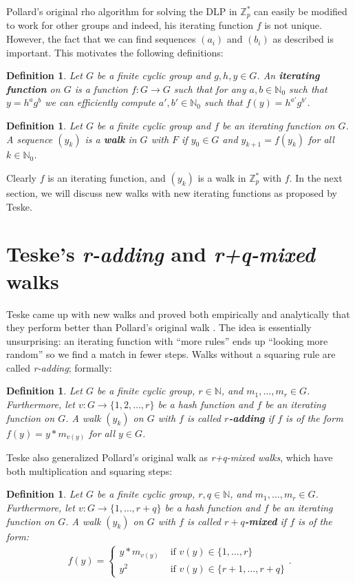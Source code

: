\documentclass{article}
\newcommand{\ZZ}{\mathbb{Z}}
\newcommand{\NN}{\mathbb{N}}
\newtheorem{defn}[thm]{Definition}
\begin{document}
Pollard's original rho algorithm for solving the DLP in $\ZZ_p^*$ can easily be modified to work for other groups and indeed, his iterating function $f$ is not unique. However, the fact that we can find sequences $(a_i)$ and $(b_i)$ as described is important. This motivates the following definitions:

\begin{defn}
	Let $G$ be a finite cyclic group and $g,h,y \in G$. An \textbf{iterating function} on $G$ is a function $f: G \to G$ such that for any $a,b \in \NN_0$ such that $y=h^a g^b$ we can efficiently compute $a', b' \in \NN_0$ such that $f(y)=h^{a'} g^{b'}$.
\end{defn}

\begin{defn}
	Let $G$ be a finite cyclic group and $f$ be an iterating function on $G$. A sequence $(y_k)$ is a \textbf{walk} in $G$ with $F$ if $y_0 \in G$ and $y_{k+1} = f(y_{k})$ for all $k \in \NN_0$.
\end{defn}

Clearly $f$ is an iterating function, and $(y_k)$ is a walk in $\ZZ_p^*$ with $f$. In the next section, we will discuss new walks with new iterating functions as proposed by Teske.

\section{Teske's \textit{r-adding} and \textit{r+q-mixed} walks}

Teske came up with new walks and proved both empirically and analytically that they perform better than Pollard's original walk \cite{Teske01}. The idea is essentially unsurprising: an iterating function with ``more rules'' ends up ``looking more random'' so we find a match in fewer steps. Walks without a squaring rule are called \textit{r-adding}; formally:

\begin{defn}
	Let $G$ be a finite cyclic group, $r \in \NN$, and $m_1, \ldots, m_r \in G$. Furthermore, let $v: G \to \{1, 2, \ldots, r\}$ be a hash function and $f$ be an iterating function on $G$. A walk $(y_k)$ on $G$ with $f$ is called \textbf{$r$-adding} if $f$ is of the form $f(y) = y * m_{v(y)}$ for all $y \in G$.
\end{defn}

Teske also generalized Pollard's original walk as \textit{r+q-mixed walks}, which have both multiplication and squaring steps:

\begin{defn}
	Let $G$ be a finite cyclic group, $r,q \in \NN$, and $m_1, \ldots, m_r \in G$. Furthermore, let $v: G \to \{1, \ldots, r+q\}$ be a hash function and $f$ be an iterating function on $G$. A walk $(y_k)$ on $G$ with $f$ is called \textbf{$r+q$-mixed} if $f$ is of the form:
	\begin{align*}
		f(y) = \begin{cases}
			y * m_{v(y)} & \text{ if } v(y) \in \{1,\ldots,r\} \\
			y^2 & \text{ if } v(y) \in \{r+1, \ldots, r+q\}
		\end{cases}.
	\end{align*}
\end{defn}
\end{document}
